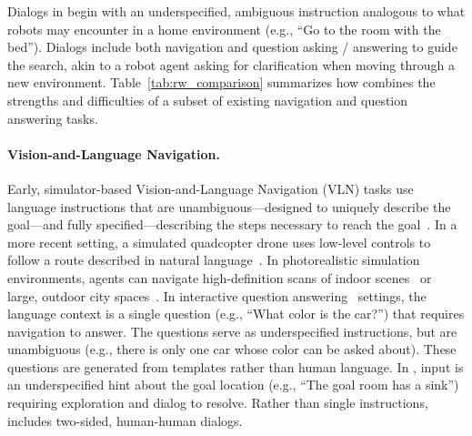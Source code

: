 
Dialogs in \dataset{} begin with an underspecified, ambiguous instruction analogous to what robots may encounter in a home environment (e.g., ``Go to the room with the bed'').
Dialogs include both navigation and question asking / answering to guide the search, akin to a robot agent asking for clarification when moving through a new environment.
Table~\ref{tab:rw_comparison} summarizes how \dataset{} combines the strengths and difficulties of a subset of existing navigation and question answering tasks.

\paragraph{Vision-and-Language Navigation.}
Early, simulator-based Vision-and-Language Navigation (VLN) tasks use language instructions that are unambiguous---designed to uniquely describe the goal---and fully specified---describing the steps necessary to reach the goal~\cite{macmahon:aaai06,chen:aaai11}.
In a more recent setting, a simulated quadcopter drone uses low-level controls to follow a route described in natural language~\cite{blukis:corl18}.
In photorealistic simulation environments, agents can navigate high-definition scans of indoor scenes~\cite{anderson:cvpr18} or large, outdoor city spaces~\cite{chen:cvpr19}.
In interactive question answering~\cite{das:cvpr18,gordon2018iqa} settings, the language context is a single question (e.g., ``What color is the car?'') that requires navigation to answer.
The questions serve as underspecified instructions, but are unambiguous (e.g., there is only one car whose color can be asked about).
These questions are generated from templates rather than human language.
In \dataset{}, input is an underspecified hint about the goal location (e.g., ``The goal room has a sink'') requiring exploration and dialog to resolve.
Rather than single instructions, \dataset{} includes two-sided, human-human dialogs.

